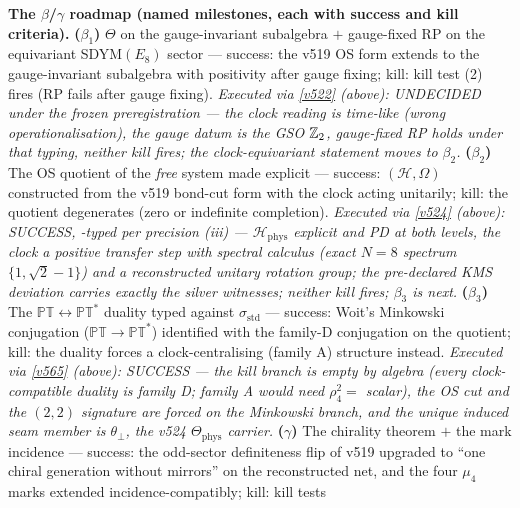 \par\smallskip\noindent\textbf{The $\beta$/$\gamma$ roadmap (named milestones, each with success
and kill criteria).}
\textbf{($\beta_1$)} $\Theta$ on the gauge-invariant subalgebra $+$ gauge-fixed RP on the
equivariant SDYM$(E_8)$ sector --- success: the v519 OS form extends to the gauge-invariant
subalgebra with positivity after gauge fixing; kill: kill test (2) fires (RP fails after gauge
fixing). \emph{Executed via \vref{v522} (above): UNDECIDED under the frozen preregistration ---
the clock reading is time-like (wrong operationalisation), the gauge datum is the GSO $\mathbb Z_2$,
gauge-fixed RP holds under that typing, neither kill fires; the clock-equivariant statement
moves to $\beta_2$.}
\textbf{($\beta_2$)} The OS quotient of the \emph{free} system made explicit --- success:
$(\mathcal H,\Omega)$ constructed from the v519 bond-cut form with the clock acting unitarily;
kill: the quotient degenerates (zero or indefinite completion). \emph{Executed via
\vref{v524} (above): SUCCESS, \mC-typed per precision (iii) --- $\mathcal H_{\mathrm{phys}}$
explicit and PD at both levels, the clock a positive transfer step with spectral calculus
(exact $N = 8$ spectrum $\{1, \sqrt2-1\}$) and a reconstructed unitary rotation group; the
pre-declared KMS deviation carries exactly the silver witnesses; neither kill fires;
$\beta_3$ is next.}
\textbf{($\beta_3$)} The $\mathbb{PT}\leftrightarrow\mathbb{PT}^*$ duality typed against
$\sigma_{\mathrm{std}}$ --- success: Woit's Minkowski conjugation ($\mathbb{PT}\to\mathbb{PT}^*$)
identified with the family-D conjugation on the quotient; kill: the duality forces a
clock-centralising (family A) structure instead. \emph{Executed via \vref{v565} (above):
SUCCESS --- the kill branch is empty by algebra (every clock-compatible duality is family D;
family A would need $\rho_4^2=$ scalar), the OS cut and the $(2,2)$ signature are forced on
the Minkowski branch, and the unique induced seam member is $\theta_\perp$, the v524
$\Theta_{\mathrm{phys}}$ carrier.}
\textbf{($\gamma$)} The chirality theorem $+$ the mark incidence --- success: the odd-sector
definiteness flip of v519 upgraded to ``one chiral generation without mirrors'' on the
reconstructed net, and the four $\mu_4$ marks extended incidence-compatibly; kill: kill tests
